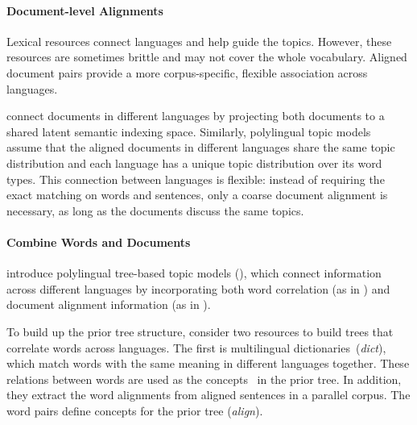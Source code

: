 \paragraph{\bf Document-level Alignments}

Lexical resources connect languages and help guide the topics. However, these resources are sometimes brittle and may not cover the whole vocabulary.  Aligned document pairs provide a more corpus-specific, flexible association across languages.


\citet{Landauer-1990} connect documents in different languages by projecting both documents to a shared latent semantic indexing space. Similarly,
polylingual topic models~\citep{mimno-09} assume that the aligned documents in different languages share the same topic distribution and each language has a unique topic distribution over its word types.  This connection between languages is flexible: instead of requiring the exact matching on words and sentences, only a coarse document alignment is necessary, as long as the documents discuss the same topics.

\paragraph{\bf Combine Words and Documents}

\citet{hu-14} introduce polylingual tree-based topic models (\ptlda{}), which connect information across different languages by incorporating both
word correlation (as in \tlda{}) and document alignment information (as in \plda{}).

To build up the prior tree structure, \citet{hu-14} consider two resources to build trees that correlate words across languages. The first is multilingual dictionaries~(\textit{dict}), which match words with the same meaning in different languages together.  These relations between words are used as the concepts~\citep{Bhattacharya-2006} in the prior tree.%
In addition, they extract the word alignments from aligned sentences in a parallel corpus.  The word pairs define concepts for the prior tree (\textit{align}).


